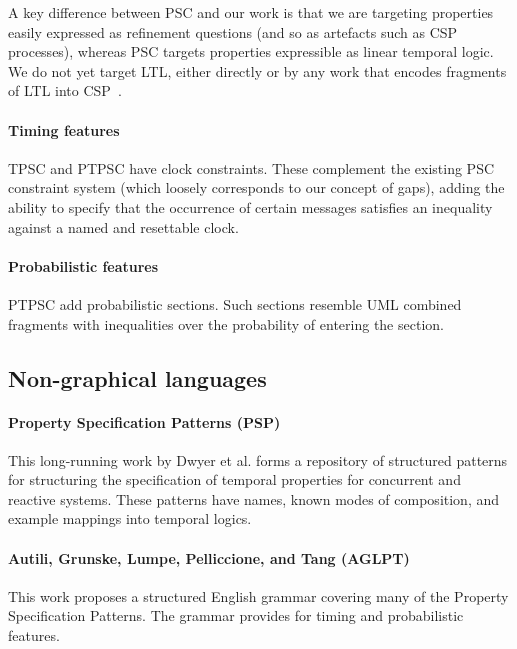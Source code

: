 A key difference between PSC and our work is that we are
targeting  properties easily expressed as refinement questions
(and so as artefacts such as CSP processes), whereas PSC targets properties
expressible as linear temporal logic.  We do not yet target LTL,
either directly or by any work that encodes fragments of LTL into
CSP~\cite{fdrspin,Lowe08-CommunicatingProcessSpecification}.

\paragraph{Timing features}
TPSC and PTPSC have clock constraints.  These complement the existing PSC constraint system
(which loosely corresponds to our concept of gaps), adding the ability to
specify that the occurrence of certain messages satisfies an inequality against
a named and resettable clock.

\paragraph{Probabilistic features}
PTPSC add probabilistic
sections.  Such sections resemble UML combined fragments with inequalities over
the probability of entering the section.

\subsection{Non-graphical languages}

\paragraph{Property Specification Patterns (PSP)}

This long-running work by Dwyer et al. forms a repository of
structured patterns for structuring the specification of temporal
properties for concurrent and reactive systems.  These patterns have names,
known modes of composition, and example mappings into temporal logics.

\paragraph{Autili, Grunske, Lumpe, Pelliccione, and Tang (AGLPT)}

This work proposes a structured English grammar covering many of the Property
Specification Patterns.  The grammar provides for timing and probabilistic
features.

